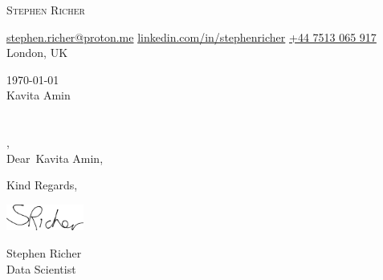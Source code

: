 \documentclass[12pt]{letter}
\makeatletter
\newcommand{\myname}{Stephen Richer}
\newcommand{\mytitle}{Data Scientist}
\newcommand{\myemail}{stephen.richer@proton.me}
\newcommand{\mylinkedin}{stephenricher}
\newcommand{\myphone}{+44 7513 065 917}
\newcommand{\mylocation}{London, UK}
\newcommand{\recipient}{Kavita Amin}
\newcommand{\greeting}{Dear}
\newcommand{\closer}{Kind Regards}
\makeatother
\begin{document}
\begin{center}
{\fontsize{28}{0}\selectfont\scshape \myname}

\href{mailto:\myemail}{\faEnvelope\enspace \myemail}\hfill
\href{https://linkedin.com/in/\mylinkedin}{\faLinkedin\enspace linkedin.com/in/\mylinkedin}\hfill
\href{tel:\myphone}{\faPhone\enspace \myphone}\hfill
\faMapMarker\enspace \mylocation
\end{center}

\vspace{0.2in}

\today\\

\vspace{-0.1in}\recipient\\
\company\\
\street\\
\city, \state\ \zip\\

\vspace{-0.1in}\greeting\ \recipient,\\

\vspace{-0.1in}\setlength\parindent{24pt}
\noindent

\vspace{0.1in}
\vfill

\begin{flushright}
\closer,

\vspace{-0.1in}\includegraphics[width=1in]{signature.png}\vspace{-0.1in}

\myname\\
\mytitle
\end{flushright}
\end{document}

